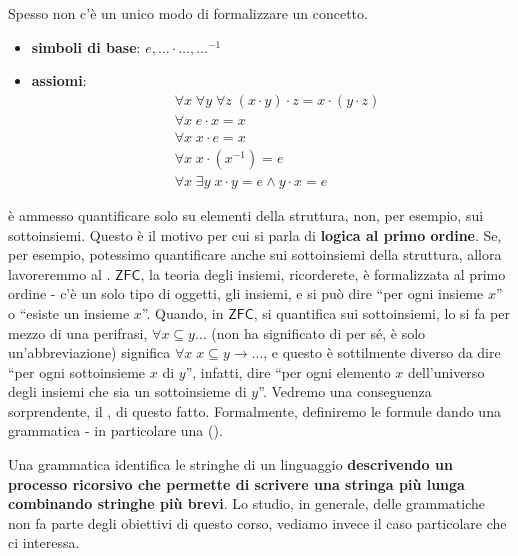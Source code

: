 Spesso non c'è un unico modo di formalizzare un concetto.

\begin{example}
    \emph{}\vspace{-0.7cm}
    \begin{itemize}
        \item \textbf{simboli di base}: $e,\ldots\cdot\ldots,\ldots^{-1}$
        \item \textbf{assiomi}:
        \begin{align*}
            &\forall x\; \forall y\; \forall z \; (x \cdot y) \cdot z = x \cdot (y \cdot z) \\
            &\forall x\; e \cdot x = x \\
            &\forall x\; x \cdot e = x \\
            &\forall x\; x \cdot (x^{-1}) = e \\
            &\forall x\; \exists y\; x \cdot y = e \land y \cdot x = e
        \end{align*}
    \end{itemize}
\end{example}

 è ammesso quantificare solo su elementi della struttura, non, per esempio, sui sottoinsiemi. Questo è il motivo per cui si parla di \textbf{logica al primo ordine}.
Se, per esempio, potessimo quantificare anche sui sottoinsiemi della struttura, allora lavoreremmo al .
$\mathsf{ZFC}$, la teoria degli insiemi, ricorderete, è formalizzata al primo ordine - c'è un solo tipo di oggetti, gli insiemi, e si può dire ``per ogni insieme $x$''
o ``esiste un insieme $x$''. Quando, in $\mathsf{ZFC}$, si quantifica sui sottoinsiemi, lo si fa per mezzo di una perifrasi, $\forall x \subseteq y \ldots$ (non ha significato di per sé, è solo un'abbreviazione) significa $\forall x \; x \subseteq y \to \ldots$, e questo è sottilmente diverso
da dire ``per ogni sottoinsieme $x$ di $y$'', infatti, dire ``per ogni elemento $x$ dell'universo degli insiemi che sia un sottoinsieme di $y$''. Vedremo una conseguenza sorprendente, il , di questo fatto. 
Formalmente, definiremo le formule dando  una grammatica - in particolare una  ().

\medskip

Una grammatica identifica le stringhe di un linguaggio \textbf{descrivendo un processo ricorsivo che permette di scrivere una stringa più lunga combinando stringhe più brevi}.
Lo studio, in generale, delle grammatiche non fa parte degli obiettivi di questo corso, vediamo invece il caso particolare che ci interessa.

